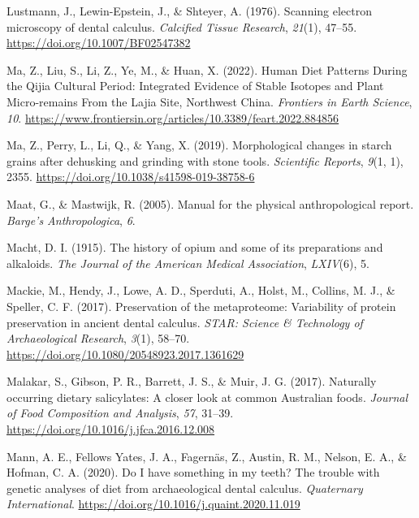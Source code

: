 \documentclass[
  letterpaper,
]{book}
\newlength{\cslhangindent}
\newlength{\cslentryspacingunit} %
\newenvironment{CSLReferences}[2] %
 {%
  \setlength{\parindent}{0pt}
  \ifodd #1
  \let\oldpar\par
  \def\par{\hangindent=\cslhangindent\oldpar}
  \fi
  \setlength{\parskip}{#2\cslentryspacingunit}
 }%
 {}
\begin{document}
\begin{CSLReferences}{1}{0}
\leavevmode{}%
Lustmann, J., Lewin-Epstein, J., \& Shteyer, A. (1976). Scanning
electron microscopy of dental calculus. \emph{Calcified Tissue
Research}, \emph{21}(1), 47--55.
\url{https://doi.org/10.1007/BF02547382}

\leavevmode{}%
Ma, Z., Liu, S., Li, Z., Ye, M., \& Huan, X. (2022). Human {Diet
Patterns During} the {Qijia Cultural Period}: {Integrated Evidence} of
{Stable Isotopes} and {Plant Micro-remains From} the {Lajia Site},
{Northwest China}. \emph{Frontiers in Earth Science}, \emph{10}.
\url{https://www.frontiersin.org/articles/10.3389/feart.2022.884856}

\leavevmode{}%
Ma, Z., Perry, L., Li, Q., \& Yang, X. (2019). Morphological changes in
starch grains after dehusking and grinding with stone tools.
\emph{Scientific Reports}, \emph{9}(1, 1), 2355.
\url{https://doi.org/10.1038/s41598-019-38758-6}

\leavevmode{}%
Maat, G., \& Mastwijk, R. (2005). Manual for the physical
anthropological report. \emph{Barge's Anthropologica}, \emph{6}.

\leavevmode{}%
Macht, D. I. (1915). The history of opium and some of its preparations
and alkaloids. \emph{The Journal of the American Medical Association},
\emph{LXIV}(6), 5.

\leavevmode{}%
Mackie, M., Hendy, J., Lowe, A. D., Sperduti, A., Holst, M., Collins, M.
J., \& Speller, C. F. (2017). Preservation of the metaproteome:
Variability of protein preservation in ancient dental calculus.
\emph{STAR: Science \& Technology of Archaeological Research},
\emph{3}(1), 58--70. \url{https://doi.org/10.1080/20548923.2017.1361629}

\leavevmode{}%
Malakar, S., Gibson, P. R., Barrett, J. S., \& Muir, J. G. (2017).
Naturally occurring dietary salicylates: {A} closer look at common
{Australian} foods. \emph{Journal of Food Composition and Analysis},
\emph{57}, 31--39. \url{https://doi.org/10.1016/j.jfca.2016.12.008}

\leavevmode{}%
Mann, A. E., Fellows Yates, J. A., Fagernäs, Z., Austin, R. M., Nelson,
E. A., \& Hofman, C. A. (2020). Do {I} have something in my teeth? {The}
trouble with genetic analyses of diet from archaeological dental
calculus. \emph{Quaternary International}.
\url{https://doi.org/10.1016/j.quaint.2020.11.019}


\end{CSLReferences}
\end{document}

